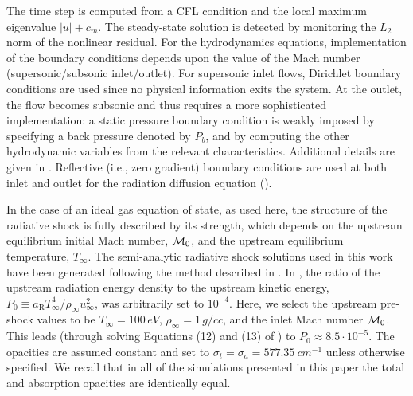 \documentclass[times,doublespace]{fldauth}%
\begin{document}
The time step is computed from a CFL condition and the local maximum eigenvalue $|u|+c_m$.
The steady-state solution is detected by monitoring the $L_2$ norm of the nonlinear residual. 
For the hydrodynamics equations, implementation of the boundary conditions depends upon the value of the Mach number (supersonic/subsonic inlet/outlet).
For supersonic inlet flows, Dirichlet boundary conditions are used since no physical information exits the system.
At the outlet, the flow becomes subsonic and thus requires a more sophisticated implementation: a static pressure boundary condition is weakly imposed by specifying a back pressure denoted by $P_b$, and by computing the other hydrodynamic variables from the relevant characteristics. Additional details are given in .
Reflective (i.e., zero gradient) boundary conditions are used at both inlet and outlet for the radiation diffusion equation ().

In the case of an ideal gas equation of state, as used here, the structure of the radiative shock is fully described by its strength, which depends on the upstream equilibrium initial Mach number, ${\cal M}_0$, and the upstream equilibrium temperature, $T_{\infty}$.
The semi-analytic radiative shock solutions used in this work have been generated following the method described in \cite{LowrieRauenzahn,LowrieEdwards}.
In \cite{LowrieEdwards}, the ratio of the upstream radiation energy density to the upstream kinetic energy, $P_0 \equiv a_{\textrm{R}} T_{\infty}^4 / \rho_{\infty} u_{\infty}^2$, was arbitrarily set to $10^{-4}$. Here, we select the upstream pre-shock values to be $T_{\infty} = 100\, eV$, $\rho_{\infty} = 1\, g/cc$, and the inlet Mach number ${\cal M}_0$. This leads
(through solving Equations (12) and (13) of \cite{LowrieRauenzahn}) to $P_0 \approx 8.5 \cdot 10^{-5}$. The opacities are assumed constant and set to $\sigma_t = \sigma_a = 577.35 \ cm^{-1}$ unless otherwise specified.
We recall that in all of the simulations presented in this paper the total and absorption opacities are identically equal.
\end{document}
